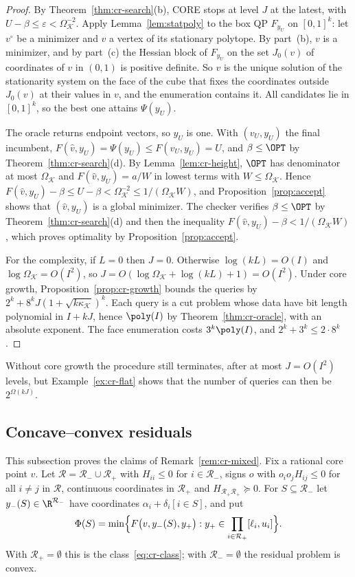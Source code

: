 \begin{proof}
By Theorem~\ref{thm:cr-search}(b), CORE stops at level $J$ at the latest,
with $U-\beta\le\varepsilon<\Omega_{\mathcal K}^{-2}$. Apply
Lemma~\ref{lem:statpoly} to the box QP $F_{y_U}$ on $[0,1]^k$: let $v^\circ$
be a minimizer and $v$ a vertex of its stationary polytope. By part~(b), $v$ is a
minimizer, and by part~(c) the Hessian block of $F_{y_U}$ on the set
$J_0(v)$ of coordinates of $v$ in $(0,1)$ is positive definite. So $v$ is the unique solution of the stationarity
system on the face of the cube that fixes the coordinates outside $J_0(v)$
at their values in $v$, and the enumeration contains it. All candidates lie
in $[0,1]^k$, so the best one attains $\Psi(y_U)$.

The oracle returns endpoint vectors, so $y_U$ is one. With $(v_U,y_U)$ the
final incumbent, $F(\hat v,y_U)=\Psi(y_U)\le F(v_U,y_U)=U$, and
$\beta\le\OPT$ by Theorem~\ref{thm:cr-search}(d). By
Lemma~\ref{lem:cr-height}, $\OPT$ has denominator at most
$\Omega_{\mathcal K}$ and $F(\hat v,y_U)=a/W$ in lowest terms with
$W\le\Omega_{\mathcal K}$. Hence
$F(\hat v,y_U)-\beta\le U-\beta<\Omega_{\mathcal K}^{-2}\le
1/(\Omega_{\mathcal K}W)$, and Proposition~\ref{prop:accept} shows that
$(\hat v,y_U)$ is a global minimizer. The checker verifies
$\beta\le\OPT$ by Theorem~\ref{thm:cr-search}(d) and then the inequality
$F(\hat v,y_U)-\beta<1/(\Omega_{\mathcal K}W)$, which proves optimality by
Proposition~\ref{prop:accept}.

For the complexity, if $L=0$ then $J=0$. Otherwise
$\log(kL)=O(I)$ and $\log\Omega_{\mathcal K}=O(I^2)$, so
$J=O(\log\Omega_{\mathcal K}+\log(kL)+1)=O(I^2)$.
Under core growth, Proposition~\ref{prop:cr-growth} bounds the queries by
$2^k+8^kJ(1+\sqrt{k\kappa_{\mathcal K}})^k$. Each query is a cut problem
whose data have bit length polynomial in $I+kJ$, hence $\poly(I)$ by
Theorem~\ref{thm:cr-oracle}, with an absolute exponent. The face
enumeration costs $3^k\poly(I)$, and $2^k+3^k\le2\cdot8^k$.
\end{proof}

Without core growth the procedure still terminates, after at most
$J=O(I^2)$ levels, but Example~\ref{ex:cr-flat} shows that the number of
queries can then be $2^{\Omega(kJ)}$.

\subsection{Concave--convex residuals}

This subsection proves the claims of Remark~\ref{rem:cr-mixed}. Fix a
rational core point $v$. Let $\mathcal R=\mathcal R_-\cup\mathcal R_+$ with
$H_{ii}\le0$ for $i\in\mathcal R_-$, signs $o$ with $o_io_jH_{ij}\le0$ for
all $i\ne j$ in $\mathcal R$, continuous coordinates in $\mathcal R_+$ and
$H_{\mathcal R_+\mathcal R_+}\succeq0$. For $S\subseteq\mathcal R_-$
let $y_-(S)\in\R^{\mathcal R_-}$ have coordinates
$\alpha_i+\delta_i[i\in S]$, and put
\[
\Phi(S)=\min\Bigl\{F\bigl(v,y_-(S),y_+\bigr):
y_+\in\prod_{i\in\mathcal R_+}[\ell_i,u_i]\Bigr\}.
\]
With $\mathcal R_+=\emptyset$ this is the class~\eqref{eq:cr-class}; with
$\mathcal R_-=\emptyset$ the residual problem is convex.

